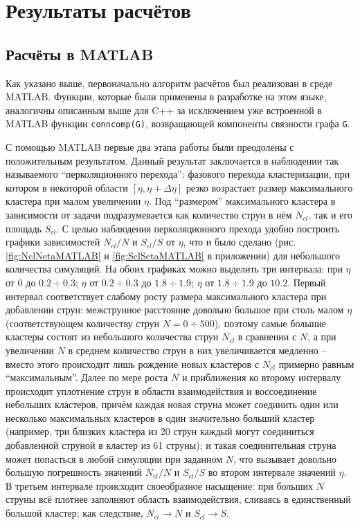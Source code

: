 \section{Результаты расчётов}
\subsection{Расчёты в MATLAB}
Как указано выше, первоначально алгоритм расчётов был реализован в среде MATLAB. Функции, которые были применены в разработке на этом языке, аналогичны описанным выше для C++ за исключением уже встроенной в MATLAB функции \texttt{conncomp(G)}, возвращающей компоненты связности графа \texttt{G}. 

С помощью MATLAB первые два этапа работы были преодолены с положительным результатом. Данный результат заключается в наблюдении так называемого ``перколяционного перехода'': фазового перехода кластеризации, при котором в некоторой области $[\eta, \eta + \Delta\eta]$ резко возрастает размер максимального кластера при малом увеличении $\eta$. Под ``размером'' максимального кластера в зависимости от задачи подразумевается как количество струн в нём $N_{cl}$, так и его площадь $S_{cl}$. С целью наблюдения перколяционного прехода удобно построить графики зависимостей $N_{cl}/N$ и $S_{cl}/S$ от $\eta$, что и было сделано (рис. \ref{fig:NclNetaMATLAB} и \ref{fig:SclSetaMATLAB} в приложении) для небольшого количества симуляций. На обоих графиках можно выделить три интервала: при $\eta$ от 0 до $0.2 \div 0.3$; $\eta$ от $0.2 \div 0.3$ до $1.8 \div 1.9$; $\eta$ от $1.8 \div 1.9$ до $10.2$. Первый интервал соответствует слабому росту размера максимального кластера при добавлении струн: межструнное расстояние довольно большое при столь малом $\eta$ (соответствующем количеству струн $N = 0 \div 500$), поэтому самые большие кластеры состоят из небольшого количества струн $N_{cl}$ в сравнении с $N$, а при увеличении $N$ в среднем количество струн в них увеличивается медленно -- вместо этого происходит лишь рождение новых кластеров с $N_{cl}$ примерно равным ``максимальным''. Далее по мере роста $N$ и приближения ко второму интервалу происходит уплотнение струн в области взаимодействия и воссоединение небольших кластеров, причём каждая новая струна может соединить один или несколько максимальных кластеров в один значительно больший кластер (например, три близких кластера из 20 струн каждый могут соединиться добавленной струной в кластер из 61 струны); и такая соединительная струна может попасться в любой симуляции при заданном $N$, что вызывает довольно большую погрешность значений $N_{cl}/N$ и $S_{cl}/S$ во втором интервале значений $\eta$. В третьем интервале происходит своеобразное насыщение: при больших $N$ струны всё плотнее заполняют область взаимодействия, сливаясь в единственный большой кластер; как следствие, $N_{cl} \rightarrow N$ и $S_{cl} \rightarrow S$.

